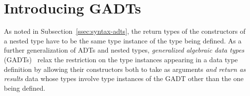 \documentclass[acmsmall,screen,review,anonymous]{acmart}
\theoremstyle{definition}
\begin{document}
\section{Introducing GADTs}


As noted in Subsection~\ref{ssec:syntax-adts},
the return types of the constructors of a nested
type have to be the same type instance of the type being defined.
As a further generalization of ADTs and nested types,
\emph{generalized algebraic data types} (GADTs)~\cite{ch03,xcc03,sp04}
relax the restriction on the type instances appearing in a data
type definition by allowing their constructors both to take as
arguments \emph{and return as results} data whose types involve type
instances of the GADT other than the one being defined.
\end{document}
